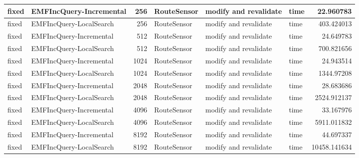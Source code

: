 \begin{table}
\begin{tabular}{| l | l | r | l | l | l | r |}
fixed & EMFIncQuery-Incremental & 256 & RouteSensor & modify and revalidate & time & 22.960783\\\hline
fixed & EMFIncQuery-LocalSearch & 256 & RouteSensor & modify and revalidate & time & 403.424013\\\hline
fixed & EMFIncQuery-Incremental & 512 & RouteSensor & modify and revalidate & time & 24.649783\\\hline
fixed & EMFIncQuery-LocalSearch & 512 & RouteSensor & modify and revalidate & time & 700.821656\\\hline
fixed & EMFIncQuery-Incremental & 1024 & RouteSensor & modify and revalidate & time & 24.943514\\\hline
fixed & EMFIncQuery-LocalSearch & 1024 & RouteSensor & modify and revalidate & time & 1344.97208\\\hline
fixed & EMFIncQuery-Incremental & 2048 & RouteSensor & modify and revalidate & time & 28.683686\\\hline
fixed & EMFIncQuery-LocalSearch & 2048 & RouteSensor & modify and revalidate & time & 2524.912137\\\hline
fixed & EMFIncQuery-Incremental & 4096 & RouteSensor & modify and revalidate & time & 33.167976\\\hline
fixed & EMFIncQuery-LocalSearch & 4096 & RouteSensor & modify and revalidate & time & 5911.011832\\\hline
fixed & EMFIncQuery-Incremental & 8192 & RouteSensor & modify and revalidate & time & 44.697337\\\hline
fixed & EMFIncQuery-LocalSearch & 8192 & RouteSensor & modify and revalidate & time & 10458.141634\\\hline



\end{tabular}
\end{table}
